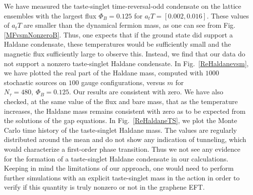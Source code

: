 \documentclass[aps,prd,twocolumn,showpacs,superscriptaddress,groupedaddress]{revtex4}  %
\begin{document}
We have measured the taste-singlet time-reversal-odd condensate on the lattice ensembles with the largest flux $\Phi_B=0.125$ for $a_t T = [0.002, 0.016]$. These values of $a_tT$ are smaller than the dynamical fermion mass, as one can see from Fig. \ref{MFvsmNonzeroB}. Thus, one expects that if the ground state did support a Haldane condensate, these temperatures would be sufficiently small and the magnetic flux sufficiently large to observe this. Instead, we find that our data do not support a nonzero taste-singlet Haldane condensate. In Fig.~\ref{ReHaldanevsm}, we have plotted the real part of the Haldane mass, computed with $1000$ stochastic sources on $100$ gauge configurations, versus $m$ for $N_{\tau}=480,~\Phi_B=0.125$. Our results are consistent with zero. We have also checked, at the same value of the flux and bare mass, that as the temperature increases, the Haldane mass remains consistent with zero as to be expected from the solutions of the gap equations. In Fig.~\ref{ReHaldaneTS}, we plot the Monte Carlo time history of the taste-singlet Haldane mass. The values are regularly distributed around the mean and do not show any indication of tunneling, which would characterize a first-order phase transition. Thus we not see any evidence for the formation of a taste-singlet Haldane condensate in our calculations. Keeping in mind the limitations of our approach, one would need to perform further simulations with an explicit taste-singlet mass in the action in order to verify if this quantity is truly nonzero or not in the graphene EFT.

\end{document}
